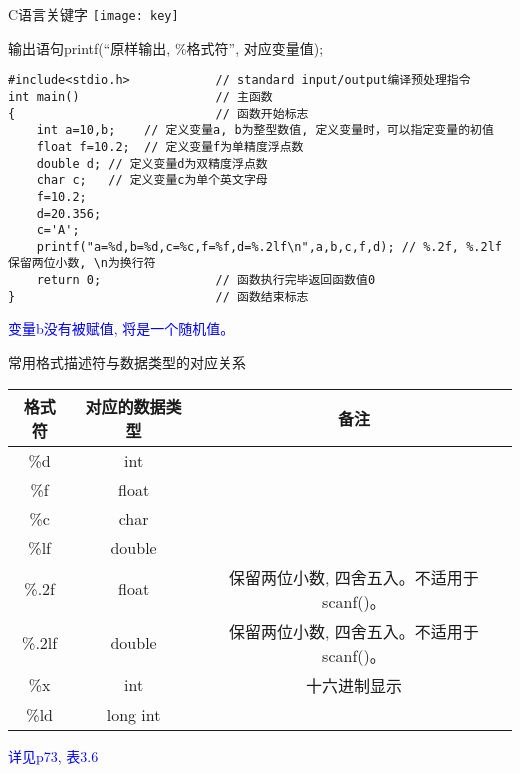 \begin{frame}{C语言关键字}
\texttt{[image: key]}
\end{frame}

\begin{frame}{输出语句printf(``原样输出, \%格式符'', 对应变量值);}
\begin{lstlisting}
#include<stdio.h>            // standard input/output编译预处理指令
int main()                   // 主函数
{                            // 函数开始标志
	int a=10,b;    // 定义变量a, b为整型数值, 定义变量时，可以指定变量的初值
	float f=10.2;  // 定义变量f为单精度浮点数
	double d; // 定义变量d为双精度浮点数
	char c;   // 定义变量c为单个英文字母
	f=10.2;
	d=20.356;
	c='A';
	printf("a=%d,b=%d,c=%c,f=%f,d=%.2lf\n",a,b,c,f,d); // %.2f, %.2lf保留两位小数, \n为换行符
	return 0;                // 函数执行完毕返回函数值0
}                            // 函数结束标志
\end{lstlisting}
\textcolor{blue}{变量b没有被赋值, 将是一个随机值。}
\end{frame}

\begin{frame}{常用格式描述符与数据类型的对应关系}
\begin{tabular}{|c|c|c|}
	\hline 
	\textbf{格式符} & \textbf{对应的数据类型} &  \textbf{备注}\\ 
	\hline 
	\%d & int &  \\ 
	\hline  
	\%f & float &  \\
	\hline
	\%c & char & \\ 
	\hline   
	\%lf & double & \\ 
	\hline 
	\%.2f & float & 保留两位小数, 四舍五入。不适用于scanf()。 \\ 
	\hline 
	\%.2lf & double & 保留两位小数, 四舍五入。不适用于scanf()。 \\ 
	\hline
	\hline   
	\%x & int & 十六进制显示 \\ 
	\hline 
	\%ld & long int &  \\ 
	\hline 
\end{tabular}
\newline
\newline
\textcolor{blue}{详见p73, 表3.6}
\end{frame}


